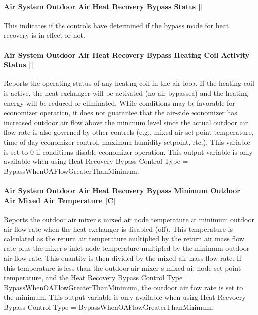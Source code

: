 \paragraph{Air System Outdoor Air Heat Recovery Bypass Status {[]}}\label{air-system-outdoor-air-heat-recovery-bypass-status}

This indicates if the controls have determined if the bypass mode for heat recovery is in effect or not.

\paragraph{Air System Outdoor Air Heat Recovery Bypass Heating Coil Activity Status {[]}}\label{air-system-outdoor-air-heat-recovery-bypass-heating-coil-activity-status}

Reports the operating status of any heating coil in the air loop. If the heating coil is active, the heat exchanger will be activated (no air bypassed) and the heating energy will be reduced or eliminated. While conditions may be favorable for economizer operation, it does not guarantee that the air-side economizer has increased outdoor air flow above the minimum level since the actual outdoor air flow rate is also governed by other controls (e.g., mixed air set point temperature, time of day economizer control, maximum humidity setpoint, etc.). This variable is set to 0 if conditions disable economizer operation. This output variable is only available when using Heat Recovery Bypass Control Type = BypassWhenOAFlowGreaterThanMinimum.

\paragraph{Air System Outdoor Air Heat Recovery Bypass Minimum Outdoor Air Mixed Air Temperature {[}C{]}}\label{air-system-outdoor-air-heat-recovery-bypass-minimum-outdoor-air-mixed-air-temperature-c}

Reports the outdoor air mixer s mixed air node temperature at minimum outdoor air flow rate when the heat exchanger is disabled (off). This temperature is calculated as the return air temperature multiplied by the return air mass flow rate plus the mixer s inlet node temperature multipled by the minimum outdoor air flow rate. This quantity is then divided by the mixed air mass flow rate. If this temperature is less than the outdoor air mixer s mixed air node set point temperature, and the Heat Recovery Bypass Control Type = BypassWhenOAFlowGreaterThanMinimum, the outdoor air flow rate is set to the minimum. This output variable is only available when using Heat Recvoery Bypass Control Type = BypassWhenOAFlowGreaterThanMinimum.

